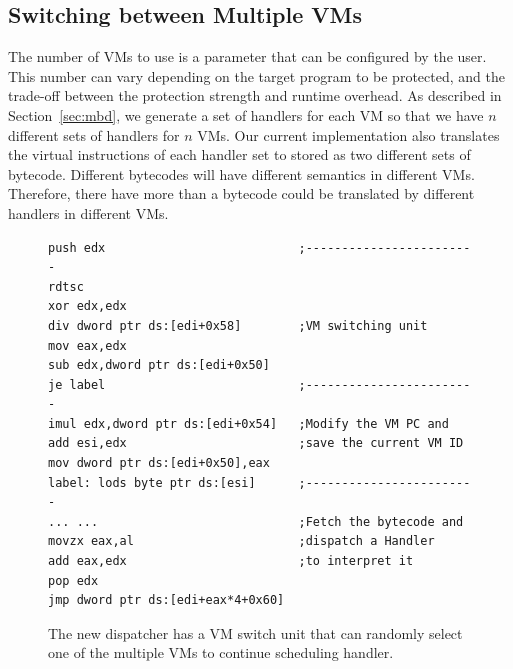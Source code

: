 \documentclass[preprint,12pt,3p]{elsarticle}
\begin{document}


\subsection{Switching between Multiple VMs}
The number of VMs to use is a  parameter that can be configured by the user. This number can vary
depending on the target program to be protected, and the trade-off between the protection strength and runtime overhead.
As described in Section~\ref{sec:mbd}, we generate a set of handlers for each VM so that
we have $n$ different sets of handlers for $n$ VMs. Our current implementation
also translates the virtual instructions of each handler set to stored as two different sets of bytecode.
Different bytecodes will have different semantics in different VMs. Therefore,
there have more than a bytecode could be translated by different handlers in different VMs.

\begin{figure}[t!]
\scriptsize
\begin{lstlisting}
push edx                           ;------------------------
rdtsc
xor edx,edx
div dword ptr ds:[edi+0x58]        ;VM switching unit
mov eax,edx
sub edx,dword ptr ds:[edi+0x50]
je label                           ;------------------------
imul edx,dword ptr ds:[edi+0x54]   ;Modify the VM PC and
add esi,edx                        ;save the current VM ID
mov dword ptr ds:[edi+0x50],eax
label: lods byte ptr ds:[esi]      ;------------------------
... ...                            ;Fetch the bytecode and
movzx eax,al                       ;dispatch a Handler
add eax,edx                        ;to interpret it
pop edx
jmp dword ptr ds:[edi+eax*4+0x60]
\end{lstlisting}
\caption{The new dispatcher has a VM switch unit that can randomly select one of the multiple VMs to continue scheduling handler.}
\label{fig:mvmswitcher}
\end{figure}
\end{document}
